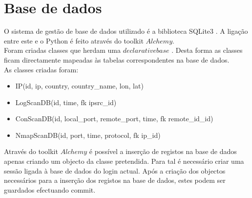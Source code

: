 \documentclass[10pt,journal,cspaper,compsoc]{IEEEtran}
\begin{document}
\section{Base de dados}
O sistema de gestão de base de dados utilizado é a biblioteca SQLite3 \cite{SQLite3}. A ligação entre este e o Python é feito através do toolkit $Alchemy$.\\
Foram criadas classes que herdam uma $declarative base$ \cite{declarative_base}. Desta forma as classes ficam directamente mapeadas às tabelas correspondentes na base de dados.\\
As classes criadas foram:
\begin{itemize}
	\item IP(id, ip, country, country\_name, lon, lat)
	\item LogScanDB(id, time, fk ipsrc\_id)
	\item ConScanDB(id, local\_port, remote\_port, time, fk remote\_id\_id)
	\item NmapScanDB(id, port, time, protocol, fk ip\_id)
\end{itemize}
Através do toolkit $Alchemy$ é possível a inserção de registos na base de dados apenas criando um objecto da classe pretendida. Para tal é necessário criar uma sessão ligada à base de dados do login actual. Após a criação dos objectos necessários para a inserção dos registos na base de dados, estes podem ser guardados efectuando commit.\\
\end{document}
